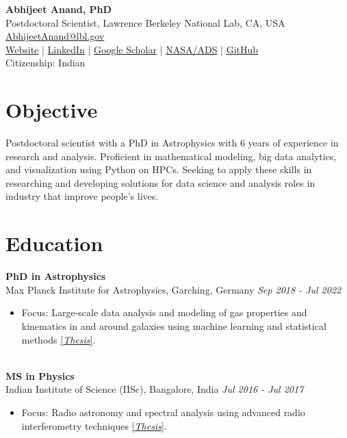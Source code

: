 \documentclass[a4paper,10pt]{article}
\begin{document}
\begin{center}
    {\LARGE \textbf{Abhijeet Anand, PhD}} \\
    Postdoctoral Scientist, Lawrence Berkeley National Lab, CA, USA \\
    \href{mailto:AbhijeetAnand@lbl.gov}{AbhijeetAnand@lbl.gov} \\
     \href{https://abhi0395.github.io/}{Website}  | \href{https://www.linkedin.com/in/abhijeet-anand-iisc}{LinkedIn} | \href{https://scholar.google.com/citations?hl=en&user=MfOuq1IAAAAJ}{Google Scholar} | \href{https://ui.adsabs.harvard.edu/public-libraries/YPXGQEsNQg-zR9R9YBYFXw}{NASA/ADS} | \href{https://github.com/abhi0395}{GitHub}\\
    Citizenship: Indian\\
\end{center}

\vspace{0.5cm}

\section*{Objective}
Postdoctoral scientist with a PhD in Astrophysics with 6 years of experience in research and analysis.
Proficient in mathematical modeling, big data analytics, and visualization using Python on HPCs. Seeking to
apply these skills in researching and developing solutions for data science and analysis roles in industry that improve people’s lives.

\section*{Education}
\noindent
\textbf{PhD in Astrophysics} \\
Max Planck Institute for Astrophysics, Garching, Germany \hfill \textit{Sep 2018 - Jul 2022} \\
\begin{itemize}[noitemsep, topsep=0pt]
    \item Focus: Large-scale data analysis and modeling of gas properties and kinematics in and around galaxies using machine learning and statistical methods \href{https://edoc.ub.uni-muenchen.de/30337/}{[\textit{Thesis}]}.
\end{itemize}

\noindent\\
\textbf{MS in Physics} \\
Indian Institute of Science (IISc), Bangalore, India \hfill \textit{Jul 2016 - Jul 2017} \\
\begin{itemize}[noitemsep, topsep=0pt]
    \item Focus: Radio astronomy and spectral analysis using advanced radio interferometry techniques \href{https://raw.githubusercontent.com/abhi0395/mycv/main/files/MS_thesis.pdf}{[\textit{Thesis}]}.
\end{itemize}
\end{document}
